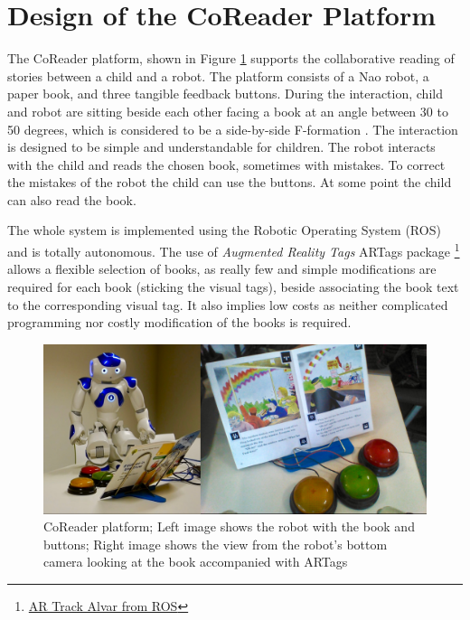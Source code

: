 \documentclass{sigchi}
\begin{document}
\section{Design of the CoReader Platform}

The CoReader platform, shown in Figure \ref{fig:readingPlatform} supports the collaborative reading of stories between a child and a robot. 
The platform consists of a Nao robot, a paper book, and three tangible feedback buttons.
During the interaction, child and robot are sitting beside each other facing a book at an angle between 30 to 50 degrees, which is considered to be a side-by-side F-formation \cite{kendon1990conducting}.
The interaction is designed to be simple and understandable for children. 
The robot interacts with the child and reads the chosen book, sometimes with mistakes. To correct the mistakes of the robot the child can use the buttons. 
At some point the child can also read the book.

The whole system is implemented using the Robotic Operating System (ROS) and is totally autonomous.
The use of \textit{Augmented Reality Tags} ARTags package \footnote{\href{http://wiki.ros.org/ar_track_alvar}{AR Track Alvar from ROS}} allows a flexible selection of books, as really few and simple modifications are required for each book (sticking the visual tags), beside associating the book text to the corresponding visual tag. 
It also implies low costs as neither complicated programming nor costly modification of the books is required.
\begin{figure}[t]
  \centering
  \includegraphics[width=1\linewidth]{figures/booknrobot2.png}
  \caption{CoReader platform; Left image shows the robot with the book and buttons; Right image shows the view from the robot's bottom camera looking at the book accompanied with ARTags}
  \label{fig:readingPlatform}
\end{figure}
\end{document}
